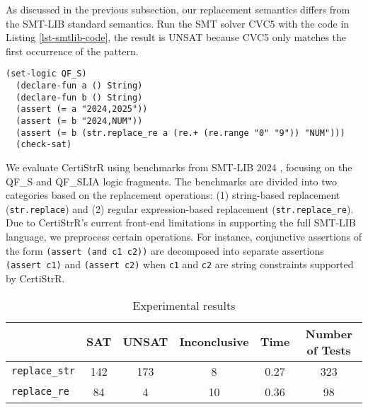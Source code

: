 \documentclass[a4paper,UKenglish,cleveref, autoref, thm-restate]{lipics-v2021}
\begin{document}
As discussed in the previous subsection, our replacement semantics differs from the SMT-LIB standard semantics.
Run the SMT solver CVC5 \cite{cvc5} with the code in Listing \ref{lst-smtlib-code}, the result is UNSAT because CVC5 only matches the first occurrence of the pattern.


\begin{lstlisting}[language=SMTLIB, caption={Example SMT-LIB Code}, label={lst-smtlib-code}]
  (set-logic QF_S)
  (declare-fun a () String)
  (declare-fun b () String)
  (assert (= a "2024,2025"))
  (assert (= b "2024,NUM"))
  (assert (= b (str.replace_re a (re.+ (re.range "0" "9")) "NUM")))
  (check-sat)
  \end{lstlisting}


  We evaluate CertiStrR using benchmarks from SMT-LIB 2024 \cite{smtlib_benchmarks}, focusing on the QF\_S and QF\_SLIA logic fragments. The benchmarks are divided into two categories based on the replacement operations: (1) string-based replacement (\texttt{str.replace}) and (2) regular expression-based replacement (\texttt{str.replace\_re}). Due to CertiStrR's current front-end limitations in supporting the full SMT-LIB language, we preprocess certain operations. For instance, conjunctive assertions of the form \texttt{(assert (and c1 c2))} are decomposed into separate assertions \texttt{(assert c1)} and \texttt{(assert c2)} when \texttt{c1} and \texttt{c2} are string constraints supported by CertiStrR.




\begin{table}[h]
  \centering
  \begin{tabular}{lccccc}
      \toprule
      & \textbf{SAT} & \textbf{UNSAT} & \textbf{Inconclusive} & \textbf{Time} & \textbf{Number of Tests} \\
      \midrule
      \texttt{replace\_str} & 142 & 173 & 8 & 0.27 & 323\\
      \texttt{replace\_re} & 84 & 4 & 10 & 0.36 & 98\\
      \bottomrule
  \end{tabular}
  \caption{Experimental results}
  \label{tab:string_operations}
\end{table}
\end{document}
